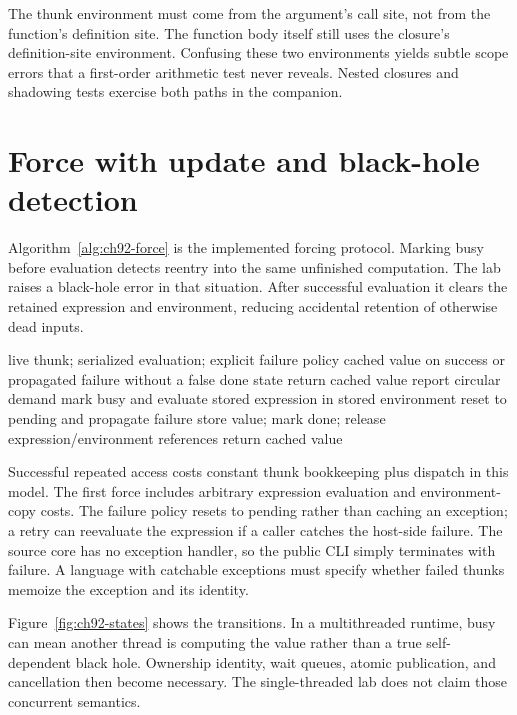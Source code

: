 The thunk environment must come from the argument's call site, not from the function's definition site.
The function body itself still uses the closure's definition-site environment.
Confusing these two environments yields subtle scope errors that a first-order arithmetic test never reveals.
Nested closures and shadowing tests exercise both paths in the companion.

\section{Force with update and black-hole detection}
\label{sec:ch92-force}
Algorithm~\ref{alg:ch92-force} is the implemented forcing protocol.
Marking busy before evaluation detects reentry into the same unfinished computation.
The lab raises a black-hole error in that situation.
After successful evaluation it clears the retained expression and environment, reducing accidental retention of otherwise dead inputs.

\begin{algorithm}[htbp]
\caption{Force and update a single-threaded call-by-need thunk.}
\label{alg:ch92-force}
\begin{pseudocode}
\Require live thunk; serialized evaluation; explicit failure policy
\Ensure cached value on success or propagated failure without a false done state
 \State return cached value \EndIf
{} \State report circular demand \EndIf
\State mark busy and evaluate stored expression in stored environment
 \State reset to pending and propagate failure \EndIf
\State store value; mark done; release expression/environment references
\State return cached value
\end{pseudocode}
\end{algorithm}

Successful repeated access costs constant thunk bookkeeping plus dispatch in this model.
The first force includes arbitrary expression evaluation and environment-copy costs.
The failure policy resets to pending rather than caching an exception; a retry can reevaluate the expression if a caller catches the host-side failure.
The source core has no exception handler, so the public CLI simply terminates with failure.
A language with catchable exceptions must specify whether failed thunks memoize the exception and its identity.

Figure~\ref{fig:ch92-states} shows the transitions.
In a multithreaded runtime, busy can mean another thread is computing the value rather than a true self-dependent black hole.
Ownership identity, wait queues, atomic publication, and cancellation then become necessary.
The single-threaded lab does not claim those concurrent semantics.

